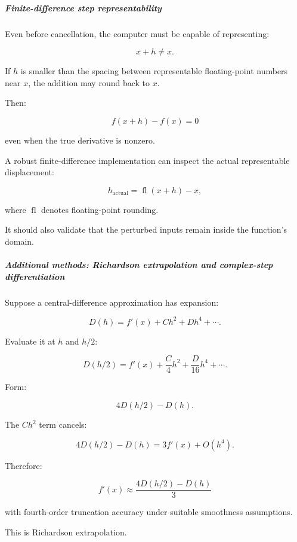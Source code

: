 \subparagraph{Finite-difference step representability}\label{02-foundations-ii-ch025-finite-difference-step-representability}

\hypertarget{02-foundations-ii-ch025-finite-difference-step-representability}{}

Even before cancellation, the computer must be capable of representing:

\[
x+h\ne x.
\]

If \(h\) is smaller than the spacing between representable floating-point numbers near \(x\), the addition may round back to \(x\).

Then:

\[
f(x+h)-f(x)=0
\]

even when the true derivative is nonzero.

A robust finite-difference implementation can inspect the actual representable displacement:

\[
h_{\mathrm{actual}}=\operatorname{fl}(x+h)-x,
\]

where \(\operatorname{fl}\) denotes floating-point rounding.

It should also validate that the perturbed inputs remain inside the function's domain.

\subparagraph{Additional methods: Richardson extrapolation and complex-step differentiation}\label{02-foundations-ii-ch025-additional-methods-richardson-extrapolation-and-complex-step-differentiation}

\hypertarget{02-foundations-ii-ch025-additional-methods-richardson-extrapolation-and-complex-step-differentiation}{}

Suppose a central-difference approximation has expansion:

\[
D(h)=f'(x)+Ch^2+Dh^4+\cdots.
\]

Evaluate it at \(h\) and \(h/2\):

\[
D(h/2)=f'(x)+\frac C4h^2+\frac D{16}h^4+\cdots.
\]

Form:

\[
4D(h/2)-D(h).
\]

The \(Ch^2\) term cancels:

\[
4D(h/2)-D(h) = 3f'(x)+O(h^4).
\]

Therefore:

\[
\boxed{ f'(x)\approx \frac{4D(h/2)-D(h)}3 }
\]

with fourth-order truncation accuracy under suitable smoothness assumptions.

This is Richardson extrapolation.

